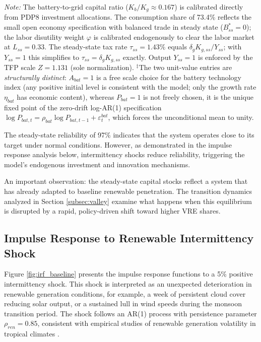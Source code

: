 \documentclass[12pt, a4paper]{article}
\begin{document}
\begin{table}[H]
\begin{tabular}{l c p{6.5cm}}
			\bottomrule
		\end{tabular}
		\vspace{0.2cm}
		\parbox{\textwidth}{\footnotesize \textit{Note:} The battery-to-grid capital ratio ($K_b / K_g \approx 0.167$) is calibrated directly from PDP8 investment allocations. The consumption share of 73.4\% reflects the small open economy specification with balanced trade in steady state ($B^*_{ss} = 0$); the labor disutility weight $\varphi$ is calibrated endogenously to clear the labor market at $L_{ss} = 0.33$. The steady-state tax rate $\tau_{ss}=1.43\%$ equals $\delta_g K_{g,ss}/Y_{ss}$; with $Y_{ss}=1$ this simplifies to $\tau_{ss}=\delta_g K_{g,ss}$ exactly. Output $Y_{ss}=1$ is enforced by the TFP scale $Z=1.131$ (sole normalization). $^\ddagger$The two unit-value entries are \textit{structurally distinct}: $A_{bat} = 1$ is a free scale choice for the battery technology index (any positive initial level is consistent with the model; only the growth rate $\eta_{bat}$ has economic content), whereas $P_{bat} = 1$ is not freely chosen, it is the unique fixed point of the zero-drift log-AR(1) specification $\log P_{bat,t} = \rho_{bat}\log P_{bat,t-1} + \varepsilon^{bat}_t$, which forces the unconditional mean to unity.}
	\end{table}
	
	The steady-state reliability of 97\% indicates that the system operates close to its target under normal conditions. However, as demonstrated in the impulse response analysis below, intermittency shocks reduce reliability, triggering the model's endogenous investment and innovation mechanisms.
	
	An important observation: the steady-state capital stocks reflect a system that has already adapted to baseline renewable penetration. The transition dynamics analyzed in Section \ref{subsec:valley} examine what happens when this equilibrium is disrupted by a rapid, policy-driven shift toward higher VRE shares.
	
	\subsection{Impulse Response to Renewable Intermittency Shock}
	
	Figure \ref{fig:irf_baseline} presents the impulse response functions to a 5\% positive intermittency shock. This shock is interpreted as an unexpected deterioration in renewable generation conditions, for example, a week of persistent cloud cover reducing solar output, or a sustained lull in wind speeds during the monsoon transition period. The shock follows an AR(1) process with persistence parameter $\rho_{ren} = 0.85$, consistent with empirical studies of renewable generation volatility in tropical climates \citep{nguyenle2019}.
	
\end{document}

